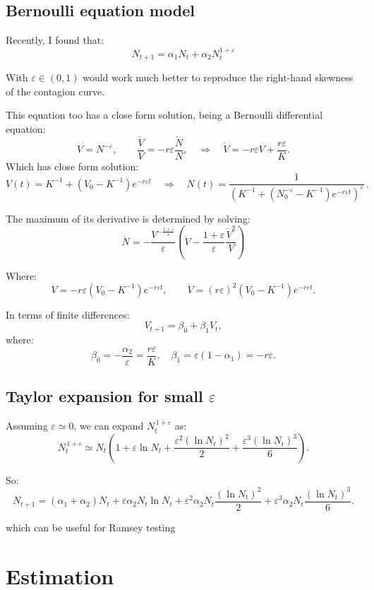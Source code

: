 \documentclass[12pt]{article}
\begin{document}
    \subsection{Bernoulli equation model}

    Recently, I found that:
    \begin{equation}
        N_{t+1} = \alpha_1 N_t + \alpha_2 N_{t}^{1 + \varepsilon}
        \label{eq:equation0}
    \end{equation}

    With $\varepsilon \in (0,1)$ would work much better to reproduce the right-hand skewness of the contagion curve.

    This equation too has a close form solution, being a Bernoulli differential equation:
    $$V = N^{-\varepsilon}, \qquad \frac{\dot V}{V} = -r \varepsilon \frac{\dot N}{N}, \quad \Rightarrow \quad \dot V = -r\varepsilon V + \frac{r\varepsilon}{K}. $$
    Which has close form solution:
    $$ V(t) = K^{-1} + \left(V_0-K^{-1}\right)e^{-r\varepsilon t} \quad \Rightarrow \quad N(t)=\frac{1}{\left(K^{-1} + \left(N_0^{-\varepsilon}-K^{-1}\right)e^{-r\varepsilon t}\right)^\varepsilon}\,.$$

    The maximum of its derivative is determined by solving:
    $$ \ddot N = -\frac{V^{-\frac{1+\varepsilon}{\varepsilon}}}{\varepsilon} \left(\ddot V -\frac{1+\varepsilon}{\varepsilon} \frac{\dot V ^2}{V}\right)$$

    Where:
    $$ \dot V = -r\varepsilon\left(V_0-K^{-1}\right)e^{-r\varepsilon t}, \qquad \ddot V = (r\varepsilon)^2 \left(V_0-K^{-1}\right)e^{-r\varepsilon t}. $$

    In terms of finite differences:
    $$ V_{t+1} = \beta_0 + \beta_1 V_t,$$
    where:
    $$\beta_0 = -\frac{\alpha_2}{\varepsilon} = \frac{r \varepsilon}{K}, \quad \beta_1=\varepsilon(1-\alpha_1) = - r\varepsilon.$$

    \subsection{Taylor expansion for small $\varepsilon$}
    Assuming $\varepsilon \simeq 0$, we can expand $N_{t}^{\,1+\varepsilon}$ as:
    \begin{equation}
        N_{t}^{\,1+\varepsilon} \simeq N_{t} \left( 1 + \varepsilon \ln N_{t} + \frac{\varepsilon^2 (\ln N_{t})^2}{2} + \frac{\varepsilon^3 (\ln N_{t})^3}{6} \right).
    \end{equation}

    So:
        \begin{equation}
        N_{t+1} = (\alpha_1 + \alpha_2) N_{t} + \varepsilon \alpha_2 N_{t}\ln N_{t} + \varepsilon^2 \alpha_2 N_{t} \frac{ (\ln N_{t})^2}{2} + \varepsilon^3 \alpha_2 N_{t} \frac{(\ln N_{t})^3}{6}.
        \end{equation}
    \newpage

    which can be useful for Ramsey testing

    \section{Estimation}\label{sec:estimation}
    
\end{document}
